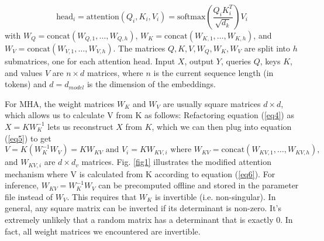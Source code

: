 \documentclass{article}
\numberwithin{equation}{section} %
\begin{document}
\begin{equation}
  \text{head}_i = \text{attention} \left( Q_i, K_i, V_i \right) = \text{softmax} \left( \frac{Q_i K_i^T}{\sqrt{d_k}} \right) V_i \label{eq2}
\end{equation}
with $W_Q = \text{concat}(W_{Q,1}, \ldots, W_{Q,h})$, $W_K = \text{concat}(W_{K,1}, \ldots, W_{K,h})$, and $W_V = \text{concat}(W_{V,1}, \ldots, W_{V,h})$. The matrices $Q, K, V, W_Q, W_K, W_V$ are split into $h$ submatrices, one for each attention head. Input $X$, output $Y$, queries $Q$, keys $K$, and values $V$ are  $n \times d$ matrices, where $n$ is the current sequence length (in tokens) and $d = d_{model}$ is the dimension of the embeddings.

For MHA, the weight matrices $W_K$ and $W_V$ are usually square matrices $d \times d$, which allows us to calculate V from K as follows: Refactoring equation (\ref{eq4}) as $X = K W_K^{-1}$ lets us reconstruct $X$ from $K$, which we can then plug into equation (\ref{eq5}) to get
\begin{equation}
  V = K (W_K^{-1} W_V) = K W_{KV}  \text{ and } V_i = K W_{KV,i} \text{ where } W_{KV} = \text{concat}(W_{KV,1}, \ldots, W_{KV,h}),
\label{eq6} \end{equation}
and $W_{KV,i}$ are $d \times d_v$ matrices. Fig. \ref{fig1} illustrates the modified attention mechanism where V is calculated from K according to equation (\ref{eq6}). For inference, $W_{KV} = W_K^{-1} W_V$ can be precomputed offline and stored in the parameter file instead of $W_V$. This requires that $W_K$ is invertible (i.e. non-singular). In general, any square matrix can be inverted if its determinant is non-zero. It’s extremely unlikely that a random matrix has a determinant that is exactly 0. In fact, all weight matrices we encountered are invertible.
\end{document}
